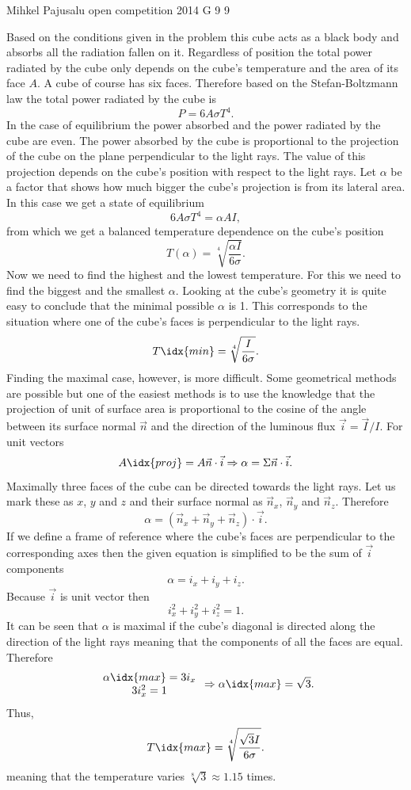 \documentclass[11pt]{article}
\begin{document}
{Mihkel Pajusalu} %
{open competition} %
{2014} %
{G 9} %
{9} %
{

\ifEngSolution
Based on the conditions given in the problem this cube acts as a black body and absorbs all the radiation fallen on it. Regardless of position the total power radiated by the cube only depends on the cube’s temperature and the area of its face $A$. A cube of course has six faces. Therefore based on the Stefan-Boltzmann law the total power radiated by the cube is
$$
P=6A\sigma T^4 .
$$
In the case of equilibrium the power absorbed and the power radiated by the cube are even. The power absorbed by the cube is proportional to the projection of the cube on the plane perpendicular to the light rays. The value of this projection depends on the cube’s position with respect to the light rays. Let $\alpha$ be a factor that shows how much bigger the cube’s projection is from its lateral area. In this case we get a state of equilibrium 
$$
6A\sigma T^4=\alpha AI,
$$
from which we get a balanced temperature dependence on the cube’s position
$$
T(\alpha)=\sqrt[4]{\frac{\alpha I}{6\sigma}}.
$$
Now we need to find the highest and the lowest temperature. For this we need to find the biggest and the smallest $\alpha$. Looking at the cube’s geometry it is quite easy to conclude that the minimal possible $\alpha$ is 1. This corresponds to the situation where one of the cube’s faces is perpendicular to the light rays. 
$$
T\idx{min}=\sqrt[4]{\frac{ I}{6\sigma}}.
$$
Finding the maximal case, however, is more difficult. Some geometrical methods are possible but one of the easiest methods is to use the knowledge that the projection of unit of surface area is proportional to the cosine of the angle between its surface normal $\vec{n}$ and the direction of the luminous flux $\vec{i}=\vec{I}/I$. For unit vectors
$$
A\idx{proj}=A\vec{n}\cdot\vec{i} \Rightarrow \alpha=\Sigma\vec{n}\cdot\vec{i}.
$$
Maximally three faces of the cube can be directed towards the light rays. Let us mark these as $x$, $y$ and $z$ and their surface normal as $\vec{n}_x$, $\vec{n}_y$ and $\vec{n}_z$. Therefore
$$
\alpha= (\vec{n}_x + \vec{n}_y + \vec{n}_z) \cdot \vec{i}.
$$
If we define a frame of reference where the cube’s faces are perpendicular to the corresponding axes then the given equation is simplified to be the sum of $\vec{i}$ components
$$
\alpha = i_x + i_y + i_z.
$$
Because $\vec{i}$ is unit vector then
$$
i_x^2+i_y^2+i_z^2=1.
$$
It can be seen that $\alpha$ is maximal if the cube’s diagonal is directed along the direction of the light rays meaning that the components of all the faces are equal. Therefore
$$
\begin{array}{c} 
\alpha\idx{max} = 3i_x  \\ 3i_x^2=1  
\end{array}
\Rightarrow \alpha\idx{max}=\sqrt{3}.
$$
Thus,
$$
T\idx{max}=\sqrt[4]{\frac{\sqrt{3} I}{6\sigma}}.
$$
meaning that the temperature varies $\sqrt[8]{3} \approx 1.15$ times.
\fi
}
\end{document}
